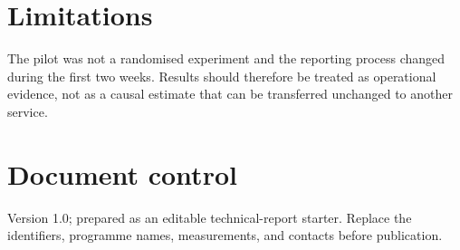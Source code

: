 \documentclass{erdc}
\begin{document}
\chapter{Limitations}

The pilot was not a randomised experiment and the reporting process changed during
the first two weeks. Results should therefore be treated as operational evidence,
not as a causal estimate that can be transferred unchanged to another service.

\chapter*{Document control}
Version 1.0; prepared as an editable technical-report starter. Replace the
identifiers, programme names, measurements, and contacts before publication.
\end{document}
